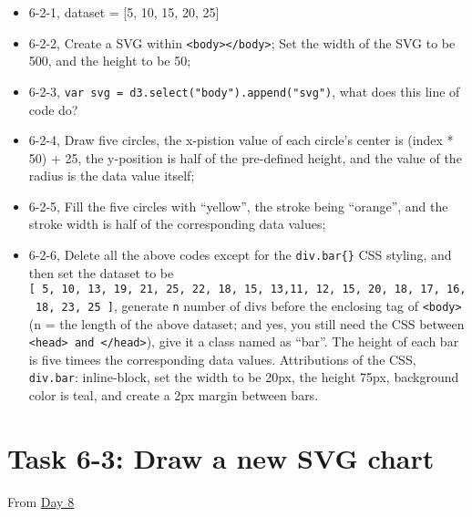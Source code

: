 \documentclass[
]{book}
\begin{document}
\begin{itemize}
\item
  6-2-1, dataset = {[}5, 10, 15, 20, 25{]}
\item
  6-2-2, Create a SVG within \texttt{\textless{}body\textgreater{}\textless{}/body\textgreater{}}; Set the width of the SVG to be 500, and the height to be 50;
\item
  6-2-3, \texttt{var\ svg\ =\ d3.select("body").append("svg")}, what does this line of code do?
\item
  6-2-4, Draw five circles, the x-pistion value of each circle's center is (index * 50) + 25, the y-position is half of the pre-defined height, and the value of the radius is the data value itself;
\item
  6-2-5, Fill the five circles with ``yellow'', the stroke being ``orange'', and the stroke width is half of the corresponding data values;
\item
  6-2-6, Delete all the above codes except for the \texttt{div.bar\{\}} CSS styling, and then set the dataset to be \texttt{{[}\ 5,\ 10,\ 13,\ 19,\ 21,\ 25,\ 22,\ 18,\ 15,\ 13,11,\ 12,\ 15,\ 20,\ 18,\ 17,\ 16,\ 18,\ 23,\ 25\ {]}}, generate \texttt{n} number of divs before the enclosing tag of \texttt{\textless{}body\textgreater{}}(n = the length of the above dataset; and yes, you still need the CSS between \texttt{\textless{}head\textgreater{}\ and\ \textless{}/head\textgreater{}}), give it a class named as ``bar''. The height of each bar is five timees the corresponding data values. Attributions of the CSS, \texttt{div.bar}: inline-block, set the width to be 20px, the height 75px, background color is teal, and create a 2px margin between bars.
\end{itemize}

\hypertarget{task-6-3-draw-a-new-svg-chart}{%
\section{Task 6-3: Draw a new SVG chart}\label{task-6-3-draw-a-new-svg-chart}}

From \href{https://observablehq.com/@hongtaoh/spet-1-2020-day-eight}{Day 8}
\end{document}
